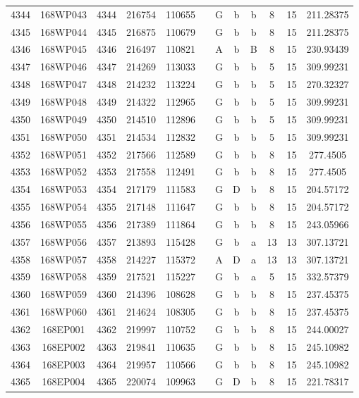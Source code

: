 \begin{tabular}{|*{12}{c|}}
4344 & 168WP043 & 4344 & 216754 & 110655 &  & G & b & b & 8 & 15 & 211.28375 \\ 
4345 & 168WP044 & 4345 & 216875 & 110679 &  & G & b & b & 8 & 15 & 211.28375 \\ 
4346 & 168WP045 & 4346 & 216497 & 110821 &  & A & b & B & 8 & 15 & 230.93439 \\ 
4347 & 168WP046 & 4347 & 214269 & 113033 &  & G & b & b & 5 & 15 & 309.99231 \\ 
4348 & 168WP047 & 4348 & 214232 & 113224 &  & G & b & b & 5 & 15 & 270.32327 \\ 
4349 & 168WP048 & 4349 & 214322 & 112965 &  & G & b & b & 5 & 15 & 309.99231 \\ 
4350 & 168WP049 & 4350 & 214510 & 112896 &  & G & b & b & 5 & 15 & 309.99231 \\ 
4351 & 168WP050 & 4351 & 214534 & 112832 &  & G & b & b & 5 & 15 & 309.99231 \\ 
4352 & 168WP051 & 4352 & 217566 & 112589 &  & G & b & b & 8 & 15 & 277.4505 \\ 
4353 & 168WP052 & 4353 & 217558 & 112491 &  & G & b & b & 8 & 15 & 277.4505 \\ 
4354 & 168WP053 & 4354 & 217179 & 111583 &  & G & D & b & 8 & 15 & 204.57172 \\ 
4355 & 168WP054 & 4355 & 217148 & 111647 &  & G & b & b & 8 & 15 & 204.57172 \\ 
4356 & 168WP055 & 4356 & 217389 & 111864 &  & G & b & b & 8 & 15 & 243.05966 \\ 
4357 & 168WP056 & 4357 & 213893 & 115428 &  & G & b & a & 13 & 13 & 307.13721 \\ 
4358 & 168WP057 & 4358 & 214227 & 115372 &  & A & D & a & 13 & 13 & 307.13721 \\ 
4359 & 168WP058 & 4359 & 217521 & 115227 &  & G & b & a & 5 & 15 & 332.57379 \\ 
4360 & 168WP059 & 4360 & 214396 & 108628 &  & G & b & b & 8 & 15 & 237.45375 \\ 
4361 & 168WP060 & 4361 & 214624 & 108305 &  & G & b & b & 8 & 15 & 237.45375 \\ 
4362 & 168EP001 & 4362 & 219997 & 110752 &  & G & b & b & 8 & 15 & 244.00027 \\ 
4363 & 168EP002 & 4363 & 219841 & 110635 &  & G & b & b & 8 & 15 & 245.10982 \\ 
4364 & 168EP003 & 4364 & 219957 & 110566 &  & G & b & b & 8 & 15 & 245.10982 \\ 
4365 & 168EP004 & 4365 & 220074 & 109963 &  & G & D & b & 8 & 15 & 221.78317 \\ 

\end{tabular}
